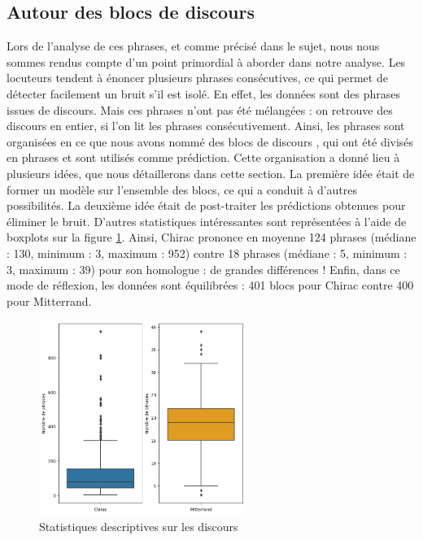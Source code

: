 \documentclass{article}
\begin{document}
\subsection{Autour des blocs de discours}
Lors de l'analyse de ces phrases, et comme précisé dans le sujet, nous nous sommes rendus compte d'un point primordial à aborder dans notre analyse. Les locuteurs tendent à énoncer plusieurs phrases consécutives, ce qui permet de détecter facilement un bruit s'il est isolé. En effet, les données sont des phrases issues de discours. Mais ces phrases n'ont pas été mélangées : on retrouve des discours en entier, si l'on lit les phrases consécutivement. Ainsi, les phrases sont organisées en ce que nous avons nommé des \og blocs de discours \fg, qui ont été divisés en phrases et sont utilisés comme prédiction. Cette organisation a donné lieu à plusieurs idées, que nous détaillerons dans cette section. La première idée était de former un modèle sur l'ensemble des blocs, ce qui a conduit à d'autres possibilités. La deuxième idée était de post-traiter les prédictions obtenues pour éliminer le bruit. D'autres statistiques intéressantes sont représentées à l'aide de boxplots sur la figure \ref{boxplot_discours}. Ainsi, Chirac prononce en moyenne 124 phrases (médiane : 130, minimum : 3, maximum : 952) contre  18 phrases (médiane : 5, minimum : 3, maximum : 39) pour son homologue : de grandes différences ! Enfin, dans ce mode de réflexion, les données sont équilibrées : 401 blocs pour Chirac contre 400 pour Mitterrand.

\begin{figure}[H]
    \centering
    \includegraphics[width=0.6\textwidth]{./src/locuteur/boxplot_discours.png} 
    \caption{Statistiques descriptives sur les discours}
    \label{boxplot_discours}
\end{figure}
\end{document}
